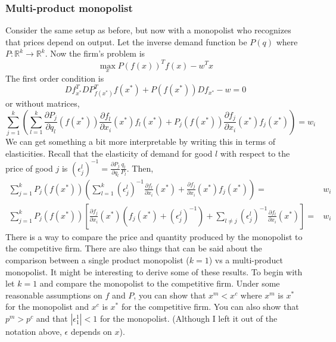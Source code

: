 \documentclass[12pt,reqno]{amsart}
\theoremstyle{definition}
\def\R{\mathbb{R}}
\renewcommand{\to}{{\rightarrow}}
\begin{document}
\subsubsection{Multi-product monopolist}
Consider the same setup as before, but now with a monopolist who
recognizes that prices depend on output. Let the inverse demand
function be $P(q)$ where $P:\R^k \to \R^k$. Now the firm's problem
is 
\[ \max_x P(f(x))^T f(x) - w^T x \]
The first order condition is
\[ Df_{x^*}^T DP_{f(x^*)}^T f(x^*) + P(f(x^*)) Df_{x^*} - w = 0 \]
or without matrices,
\[ \sum_{j=1}^k \left( \sum_{l=1}^k \frac{\partial P_j}{\partial q_l}(f(x^*))
  \frac{\partial f_l}{\partial x_i}(x^*) f_l(x^*) + 
  P_j(f(x^*)) \frac{\partial f_j}{\partial x_i}(x^*) f_j(x^*) \right)
= w_i \]
We can get something a bit more interpretable by writing this in terms
of elasticities. Recall that the elasticity of demand for good $l$
with respect to the price of good $j$ is $(\epsilon^l_j)^{-1}=
\frac{\partial P_j}{\partial q_l} \frac{q_l}{P_l}$. Then,
\begin{align*}
  \sum_{j=1}^k P_j(f(x^*)) \left(\sum_{l=1}^k (\epsilon^l_j)^{-1} \frac{\partial
      f_l}{\partial x_i}(x^*) +  \frac{\partial f_j}{\partial x_i}(x^*) f_j(x^*) \right)
  = & w_i \\
  \sum_{j=1}^k P_j(f(x^*)) \left[\frac{\partial f_j}{\partial x_i}(x^*)
    \left(f_j(x^*) + (\epsilon_j^j)^{-1} \right) + \sum_{l \neq j}
  (\epsilon_j^l)^{-1} \frac{\partial f_l}{\partial x_i}(x^*) \right] = & w_i 
\end{align*}
There is a way to compare the price and quantity produced by the
monopolist to the competitive firm. There are also things that can be
said about the comparison between a single product monopolist ($k=1$)
vs a multi-product monopolist. It might be interesting to derive some
of these results. To begin with let $k = 1$ and compare the monopolist
to the competitive firm. Under some reasonable assumptions on $f$ and
$P$, you can show that $x^m < x^c$ where $x^m$ is $x^*$ for the
monopolist and $x^c$ is $x^*$ for the competitive firm. You can also
show that $p^m>p^c$ and that $|\epsilon^1_1| < 1$ for the
monopolist. (Although I left it out of the notation above, $\epsilon$
depends on $x$). 
\end{document}
